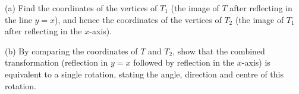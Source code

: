 \begin{question}
\begin{center}
\begin{tikzpicture}[scale=0.75, transform shape]
\end{tikzpicture}
\end{center}

\noindent (a) Find the coordinates of the vertices of $T_1$ (the image of $T$ after reflecting in the line $y = x$), and hence the coordinates of the vertices of $T_2$ (the image of $T_1$ after reflecting in the $x$-axis).

\vspace{3cm}

\noindent (b) By comparing the coordinates of $T$ and $T_2$, show that the combined transformation (reflection in $y = x$ followed by reflection in the $x$-axis) is equivalent to a single rotation, stating the angle, direction and centre of this rotation.

\vspace{4cm}

\end{question}